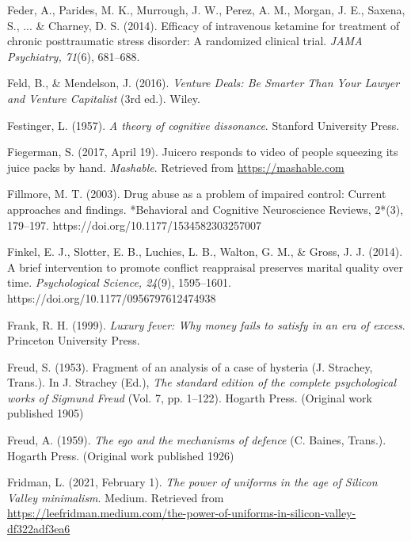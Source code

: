 \begin{thebibliography}{}

    Feder, A., Parides, M. K., Murrough, J. W., Perez, A. M., Morgan, J. E., Saxena, S., ... \& Charney, D. S. (2014). Efficacy of intravenous ketamine for treatment of chronic posttraumatic stress disorder: A randomized clinical trial. \textit{JAMA Psychiatry, 71}(6), 681–688.

    Feld, B., \& Mendelson, J. (2016). \textit{Venture Deals: Be Smarter Than Your Lawyer and Venture Capitalist} (3rd ed.). Wiley.
    
    Festinger, L. (1957). \textit{A theory of cognitive dissonance}. Stanford University Press.

    Fiegerman, S. (2017, April 19). Juicero responds to video of people squeezing its juice packs by hand. \textit{Mashable}. Retrieved from \url{https://mashable.com}

    Fillmore, M. T. (2003). Drug abuse as a problem of impaired control: Current approaches and findings. *Behavioral and Cognitive Neuroscience Reviews, 2*(3), 179–197. https://doi.org/10.1177/1534582303257007

    Finkel, E. J., Slotter, E. B., Luchies, L. B., Walton, G. M., \& Gross, J. J. (2014). A brief intervention to promote conflict reappraisal preserves marital quality over time. \textit{Psychological Science, 24}(9), 1595–1601. https://doi.org/10.1177/0956797612474938

    Frank, R. H. (1999). \textit{Luxury fever: Why money fails to satisfy in an era of excess}. Princeton University Press.

    Freud, S. (1953). Fragment of an analysis of a case of hysteria (J. Strachey, Trans.). In J. Strachey (Ed.), \textit{The standard edition of the complete psychological works of Sigmund Freud} (Vol. 7, pp. 1–122). Hogarth Press. (Original work published 1905)

    Freud, A. (1959). \textit{The ego and the mechanisms of defence} (C. Baines, Trans.). Hogarth Press. (Original work published 1926)

    Fridman, L. (2021, February 1). \textit{The power of uniforms in the age of Silicon Valley minimalism}. Medium. Retrieved from \url{https://leefridman.medium.com/the-power-of-uniforms-in-silicon-valley-df322adf3ea6}


\end{thebibliography}
